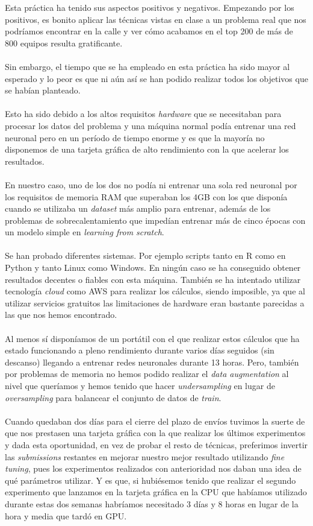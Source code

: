 Esta práctica ha tenido sus aspectos positivos y negativos. Empezando por los positivos, es bonito aplicar las técnicas vistas en clase a un problema real que nos podríamos encontrar en la calle y ver cómo acabamos en el top 200 de más de 800 equipos resulta gratificante.
\\ \\
Sin embargo, el tiempo que se ha empleado en esta práctica ha sido mayor al esperado y lo peor es que ni aún así se han podido realizar todos los objetivos que se habían planteado.
\\ \\
Esto ha sido debido a los altos requisitos \textit{hardware} que se necesitaban para procesar los datos del problema y una máquina normal podía entrenar una red neuronal pero en un período de tiempo enorme y es que la mayoría no disponemos de una tarjeta gráfica de alto rendimiento con la que acelerar los resultados.
\\ \\
En nuestro caso, uno de los dos no podía ni entrenar una sola red neuronal por los requisitos de memoria RAM que superaban los 4GB con los que disponía cuando se utilizaba un \textit{dataset} más amplio para entrenar, además de los problemas de sobrecalentamiento que impedían entrenar más de cinco épocas con un modelo simple en \textit{learning from scratch}.
\\ \\
Se han probado diferentes sistemas. Por ejemplo scripts tanto en R como en Python y tanto Linux como Windows. En ningún caso se ha conseguido obtener resultados decentes o fiables con esta máquina. También se ha intentado utilizar tecnología \textit{cloud} como AWS para realizar los cálculos, siendo imposible, ya que al utilizar servicios gratuitos las limitaciones de hardware eran bastante parecidas a las que nos hemos encontrado.
\\ \\
Al menos sí disponíamos de un portátil con el que realizar estos cálculos que ha estado funcionando a pleno rendimiento durante varios días seguidos (sin descanso) llegando a entrenar redes neuronales durante 13 horas. Pero, también por problemas de memoria no hemos podido realizar el \textit{data augmentation} al nivel que queríamos y hemos tenido que hacer \textit{undersampling} en lugar de \textit{oversampling} para balancear el conjunto de datos de \textit{train}.
\\ \\
Cuando quedaban dos días para el cierre del plazo de envíos tuvimos la suerte de que nos prestasen una tarjeta gráfica con la que realizar los últimos experimentos y dada esta oportunidad, en vez de probar el resto de técnicas, preferimos invertir las \textit{submissions} restantes en mejorar nuestro mejor resultado utilizando \textit{fine tuning}, pues los experimentos realizados con anterioridad nos daban una idea de qué parámetros utilizar. Y es que, si hubiésemos tenido que realizar el segundo experimento que lanzamos en la tarjeta gráfica en la CPU que habíamos utilizado durante estas dos semanas habríamos necesitado 3 días y 8 horas en lugar de la hora y media que tardó en GPU.

